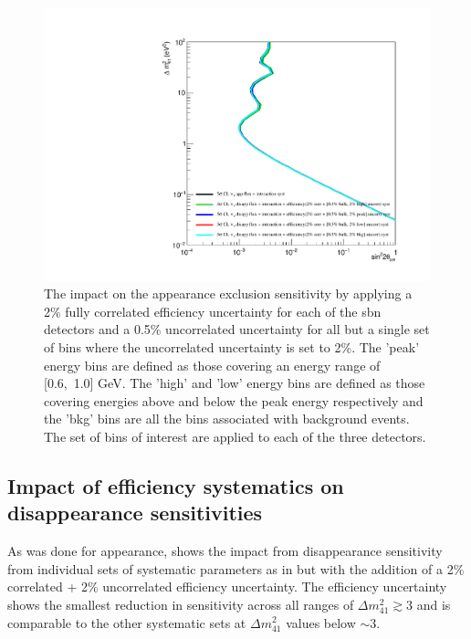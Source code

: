 \begin{figure}[h!]
    \centering
    \includegraphics[width = \largefigwidth]{figures-chap6/exclusion_contours/efficiency_systematics/nue_app_2pct_cor_05pct_bulk_2pct_X_uncor.pdf}
    \caption[\nue disapp with poorly constrained efficiency systematic for a set of bins.]{The impact on the \nue appearance exclusion sensitivity by applying a 2\% fully correlated efficiency uncertainty for each of the \gls{sbn} detectors and a 0.5\% uncorrelated uncertainty for all but a single set of bins where the uncorrelated uncertainty is set to 2\%. The 'peak' energy bins are defined as those covering an energy range of [0.6,~1.0] GeV. The 'high' and 'low' energy bins are defined as those covering energies above and below the peak energy respectively and the 'bkg' bins are all the bins associated with background events. The set of bins of interest are applied to each of the three detectors.}
    \label{fig:nue_app_bulk_uncertainty}
\end{figure}



\clearpage

\subsection{\texorpdfstring{Impact of efficiency systematics on \nue disappearance sensitivities}{Impact of efficiency systematics on nue disappearance sensitivities}}

As was done for \nue appearance,  shows the impact from \nue disappearance sensitivity from individual sets of systematic parameters as in  but with the addition of a 2\% correlated + 2\% uncorrelated efficiency uncertainty. The efficiency uncertainty shows the smallest reduction in sensitivity across all ranges of $\Delta m_{41}^2 \gtrsim 3$ and is comparable to the other systematic sets at $\Delta m_{41}^2$ values below $\sim 3$.

